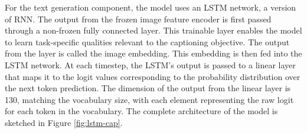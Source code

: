 \documentclass{l4proj}
\begin{document}




For the text generation component, the model uses an LSTM network, a version of RNN. The output from the frozen image feature encoder is first passed through a non-frozen fully connected layer. This trainable layer enables the model to learn task-specific qualities relevant to the captioning objective. The output from the layer is called the image embedding. This embedding is then fed into the LSTM network. At each timestep, the LSTM's output is passed to a linear layer that maps it to the logit values corresponding to the probability distribution over the next token prediction. The dimension of the output from the linear layer is 130, matching the vocabulary size, with each element representing the raw logit for each token in the vocabulary. The complete architecture of the model is sketched in Figure \ref{fig:lstm-cap}.
\end{document}

